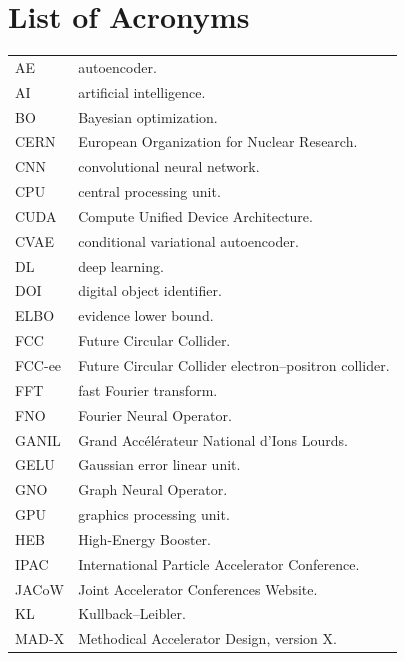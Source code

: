 \chapter*{List of Acronyms}
\begingroup
\setlength{\LTleft}{0.198\textwidth}
\setlength{\LTright}{0pt}
\begin{longtable}{@{}p{}@{}p{}@{}}
AE & autoencoder.\\
AI & artificial intelligence.\\
\noalign{\vskip\baselineskip}
BO & Bayesian optimization.\\
\noalign{\vskip\baselineskip}
CERN & European Organization for Nuclear Research.\\
CNN & convolutional neural network.\\
CPU & central processing unit.\\
CUDA & Compute Unified Device Architecture.\\
CVAE & conditional variational autoencoder.\\
\noalign{\vskip\baselineskip}
DL & deep learning.\\
DOI & digital object identifier.\\
\noalign{\vskip\baselineskip}
ELBO & evidence lower bound.\\
\noalign{\vskip\baselineskip}
FCC & Future Circular Collider.\\
FCC-ee & Future Circular Collider electron–positron collider.\\
FFT & fast Fourier transform.\\
FNO & Fourier Neural Operator.\\
\noalign{\vskip\baselineskip}
GANIL & Grand Accélérateur National d’Ions Lourds.\\
GELU & Gaussian error linear unit.\\
GNO & Graph Neural Operator.\\
GPU & graphics processing unit.\\
\noalign{\vskip\baselineskip}
HEB & High-Energy Booster.\\
\noalign{\vskip\baselineskip}
IPAC & International Particle Accelerator Conference.\\
\noalign{\vskip\baselineskip}
JACoW & Joint Accelerator Conferences Website.\\
\noalign{\vskip\baselineskip}
KL & Kullback–Leibler.\\
\noalign{\vskip\baselineskip}
MAD-X & Methodical Accelerator Design, version X.\\

\end{longtable}
